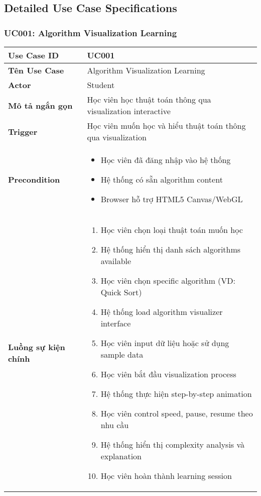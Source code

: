 \subsection{Detailed Use Case Specifications}
\label{subsec:detailed-usecase-specs}

\subsubsection{UC001: Algorithm Visualization Learning}

\begin{longtable}{| p{3cm} | p{10cm} |}
\hline
\textbf{Use Case ID} & UC001 \\ \hline
\textbf{Tên Use Case} & Algorithm Visualization Learning \\ \hline
\textbf{Actor} & Student \\ \hline
\textbf{Mô tả ngắn gọn} & Học viên học thuật toán thông qua visualization interactive \\ \hline
\textbf{Trigger} & Học viên muốn học và hiểu thuật toán thông qua visualization \\ \hline
\textbf{Precondition} & 
\begin{itemize}
    \item Học viên đã đăng nhập vào hệ thống
    \item Hệ thống có sẵn algorithm content
    \item Browser hỗ trợ HTML5 Canvas/WebGL
\end{itemize} \\ \hline
\textbf{Luồng sự kiện chính} & 
\begin{enumerate}
    \item Học viên chọn loại thuật toán muốn học
    \item Hệ thống hiển thị danh sách algorithms available
    \item Học viên chọn specific algorithm (VD: Quick Sort)
    \item Hệ thống load algorithm visualizer interface
    \item Học viên input dữ liệu hoặc sử dụng sample data
    \item Học viên bắt đầu visualization process
    \item Hệ thống thực hiện step-by-step animation
    \item Học viên control speed, pause, resume theo nhu cầu
    \item Hệ thống hiển thị complexity analysis và explanation
    \item Học viên hoàn thành learning session

\end{enumerate}
\end{longtable}
